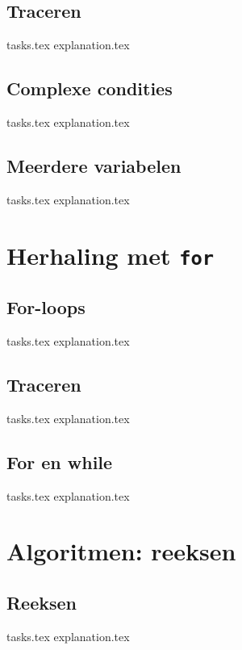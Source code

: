 \documentclass[b5paper,openright,twoside]{report}
\begin{document}
    \section{Traceren}
    {tasks.tex}             \newpage
    {explanation.tex}       \newpage

    \section{Complexe condities}
    {tasks.tex}       \newpage
    {explanation.tex} \newpage

    \section{Meerdere variabelen}
    {tasks.tex}       \newpage
    {explanation.tex} \newpage

    \chapter{Herhaling met \texttt{for}}
    \newpage

    \section{For-loops}
    {tasks.tex}           \newpage
    {explanation.tex}     \newpage

    \section{Traceren}
    {tasks.tex}                 \newpage
    {explanation.tex}           \newpage

    \section{For en while}
    {tasks.tex}           \newpage
    {explanation.tex}     \newpage

    \chapter{Algoritmen: reeksen}
    \newpage

    \section{Reeksen}
    {tasks.tex}           \newpage
    {explanation.tex}     \newpage
\end{document}
